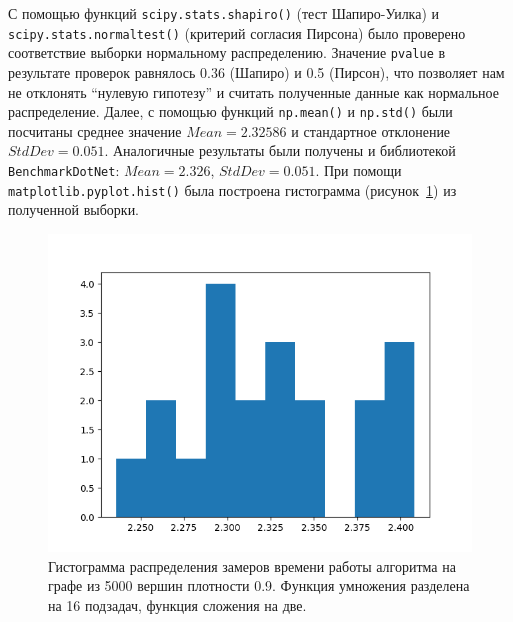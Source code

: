 \begin{table}[h]
\centering
    \caption{Замеры времени работы параллельной версии алгоритма на графе с 5000 вершинами плотности $0.9$. Функция умножения разделена на 16 подзадач, функция сложения на две. Время измерено в секундах.}
    \label{data}
\end{table}

С помощью функций \texttt{scipy.stats.shapiro()} (тест Шапиро-Уилка) и \texttt{scipy.stats.normaltest()} (критерий согласия Пирсона) было проверено соответствие выборки нормальному распределению. Значение \texttt{pvalue} в результате проверок равнялось 0.36 (Шапиро) и 0.5 (Пирсон), что позволяет нам не отклонять \enquote{нулевую гипотезу} и считать полученные данные как нормальное распределение. Далее, с помощью функций \texttt{np.mean()} и \texttt{np.std()} были посчитаны среднее значение $Mean = 2.32586$ и стандартное отклонение $StdDev = 0.051$. Аналогичные результаты были получены и библиотекой \texttt{BenchmarkDotNet}: $Mean = 2.326$, $StdDev = 0.051$. При помощи \texttt{matplotlib.pyplot.hist()} была построена гистограмма (рисунок~\ref{fig:plot}) из полученной выборки.

\begin{figure}[H]
    \centering
    \includegraphics[width=\textwidth]{figures/plot.png}
    \caption{Гистограмма распределения замеров времени работы алгоритма на графе из 5000 вершин плотности 0.9. Функция умножения разделена на 16 подзадач, функция сложения на две.}
    \label{fig:plot}
\end{figure}

